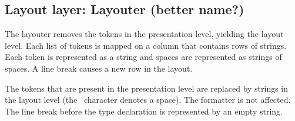 \subsection{Layout layer: Layouter (better name?)} \label{sect:layouter}

The layouter removes the tokens in the presentation level, yielding the layout level. Each list of tokens is mapped on a column that contains rows of strings. Each token is represented as a string  and spaces are represented as strings of spaces. A line break causes a new row in the layout. 

%



 The tokens that are present in the presentation level are replaced by strings in the layout level (the \textvisiblespace~character denotes a space). The formatter is not affected. The line break before the type declaration is represented by an empty string. 

